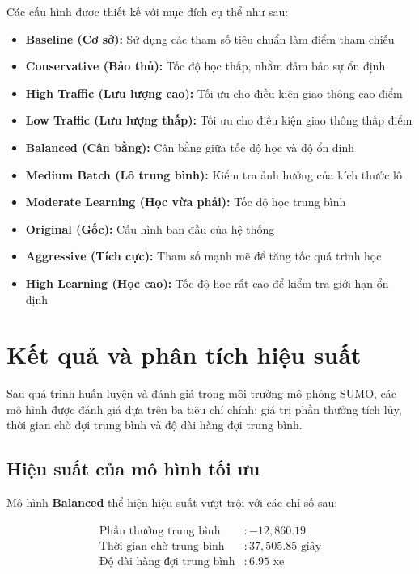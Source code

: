 Các cấu hình được thiết kế với mục đích cụ thể như sau:
\begin{itemize}
    \item \textbf{Baseline (Cơ sở):} Sử dụng các tham số tiêu chuẩn làm điểm tham chiếu
    \item \textbf{Conservative (Bảo thủ):} Tốc độ học thấp, nhằm đảm bảo sự ổn định
    \item \textbf{High Traffic (Lưu lượng cao):} Tối ưu cho điều kiện giao thông cao điểm
    \item \textbf{Low Traffic (Lưu lượng thấp):} Tối ưu cho điều kiện giao thông thấp điểm
    \item \textbf{Balanced (Cân bằng):} Cân bằng giữa tốc độ học và độ ổn định
    \item \textbf{Medium Batch (Lô trung bình):} Kiểm tra ảnh hưởng của kích thước lô
    \item \textbf{Moderate Learning (Học vừa phải):} Tốc độ học trung bình
    \item \textbf{Original (Gốc):} Cấu hình ban đầu của hệ thống
    \item \textbf{Aggressive (Tích cực):} Tham số mạnh mẽ để tăng tốc quá trình học
    \item \textbf{High Learning (Học cao):} Tốc độ học rất cao để kiểm tra giới hạn ổn định
\end{itemize}

\section{Kết quả và phân tích hiệu suất}

Sau quá trình huấn luyện và đánh giá trong môi trường mô phỏng SUMO, các mô hình được đánh giá dựa trên ba tiêu chí chính: giá trị phần thưởng tích lũy, thời gian chờ đợi trung bình và độ dài hàng đợi trung bình.

\subsection{Hiệu suất của mô hình tối ưu}

Mô hình \textbf{Balanced} thể hiện hiệu suất vượt trội với các chỉ số sau:

\begin{align}
\text{Phần thưởng trung bình} &: -12,860.19 \\
\text{Thời gian chờ trung bình} &: 37,505.85 \text{ giây} \\
\text{Độ dài hàng đợi trung bình} &: 6.95 \text{ xe}
\end{align}


